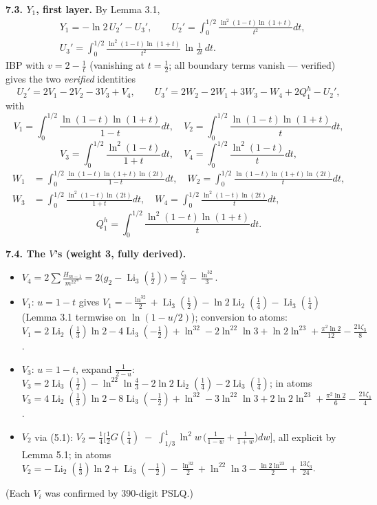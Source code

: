 \documentclass[11pt]{article}
\theoremstyle{remark}
\begin{document}
\textbf{7.3. $Y_1$, first layer.} By Lemma 3.1,
\[
\begin{aligned}
&Y_1=-\ln2\,U_2'-U_3',\qquad
U_2'=\int_0^{1/2}\frac{\ln^2(1-t)\ln(1+t)}{t^2}dt,\\
&U_3'=\int_0^{1/2}\frac{\ln^2(1-t)\ln(1+t)}{t^2}\,\ln\frac{1}{2t}\,dt .
\end{aligned}
\]
IBP with $v=2-\tfrac1t$ (vanishing at $t=\tfrac12$; all boundary terms vanish --- verified) gives the two \textit{verified} identities
\[
U_2'=2V_1-2V_2-3V_3+V_4,\qquad
U_3'=2W_2-2W_1+3W_3-W_4+2Q_1^{h}-U_2',
\]
with
\[
V_1=\int_0^{1/2}\frac{\ln(1-t)\ln(1+t)}{1-t}dt,\quad
V_2=\int_0^{1/2}\frac{\ln(1-t)\ln(1+t)}{t}dt,
\]
\[
V_3=\int_0^{1/2}\frac{\ln^2(1-t)}{1+t}dt,\quad
V_4=\int_0^{1/2}\frac{\ln^2(1-t)}{t}dt,
\]
\[
\begin{aligned}
W_1&=\int_0^{1/2}\frac{\ln(1-t)\ln(1+t)\ln(2t)}{1-t}dt,\quad
W_2=\int_0^{1/2}\frac{\ln(1-t)\ln(1+t)\ln(2t)}{t}dt,\\
W_3&=\int_0^{1/2}\frac{\ln^2(1-t)\ln(2t)}{1+t}dt,\quad
W_4=\int_0^{1/2}\frac{\ln^2(1-t)\ln(2t)}{t}dt,
\end{aligned}
\]
\[
Q_1^{h}=\int_0^{1/2}\frac{\ln^2(1-t)\ln(1+t)}{t}dt .
\]

\textbf{7.4. The $V$'s (weight 3, fully derived).}
\begin{itemize}
\item $V_4=2\sum\frac{H_{m-1}}{m^22^m}=2\bigl(g_2-\operatorname{Li}_3(\tfrac12)\bigr)=\frac{\zeta_3}{4}-\frac{\ln^32}{3}$.
\item $V_1$: $u=1-t$ gives $V_1=-\frac{\ln^32}{2}+\operatorname{Li}_3(\tfrac12)-\ln2\operatorname{Li}_2(\tfrac14)-\operatorname{Li}_3(\tfrac14)$ (Lemma 3.1 termwise on $\ln(1-u/2)$); conversion to atoms:
$V_1=2\operatorname{Li}_2(\tfrac13)\ln2-4\operatorname{Li}_3(-\tfrac12)+\ln^32-2\ln^22\ln3+\ln2\ln^23+\frac{\pi^2\ln2}{12}-\frac{21\zeta_3}{8}$.
\item $V_3$: $u=1-t$, expand $\frac1{2-u}$: $V_3=2\operatorname{Li}_3(\tfrac12)-\ln^22\ln\frac43-2\ln2\operatorname{Li}_2(\tfrac14)-2\operatorname{Li}_3(\tfrac14)$; in atoms
$V_3=4\operatorname{Li}_2(\tfrac13)\ln2-8\operatorname{Li}_3(-\tfrac12)+\ln^32-3\ln^22\ln3+2\ln2\ln^23+\frac{\pi^2\ln2}{6}-\frac{21\zeta_3}{4}$.
\item $V_2$ via (5.1): $V_2=\frac14\bigl[\frac12 G(\tfrac14)\;-\;\int_{1/3}^1\ln^2w\,\bigl(\tfrac1{1-w}+\tfrac1{1+w}\bigr)dw\bigr]$, all explicit by Lemma 5.1; in atoms
$V_2=-\operatorname{Li}_2(\tfrac13)\ln2+\operatorname{Li}_3(-\tfrac12)-\frac{\ln^32}{2}+\ln^22\ln3-\frac{\ln2\ln^23}{2}+\frac{13\zeta_3}{24}$.
\end{itemize}
(Each $V_i$ was confirmed by 390-digit PSLQ.)
\end{document}
